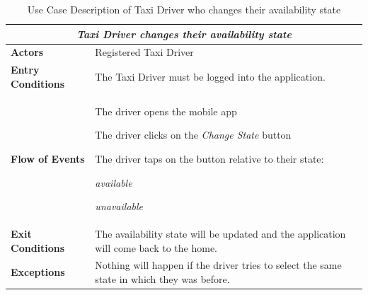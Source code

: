 \documentclass[a4paper]{article}
\begin{document}
\begin{table} [H]
\begin{center}
\begin{tabular}{ |m{}|m{}|  }
\hline
    \multicolumn{2}{|c|}{\textbf{\textit{Taxi Driver changes their availability state}}} \\
\hline \hline
    \textbf{Actors}
&   Registered Taxi Driver
\\ \hline
    \textbf{Entry Conditions}
&   The Taxi Driver must be logged into the application.
\\ \hline
    \textbf{Flow of Events}
& 
    \begin{enumerate*}
    \item The driver opens the mobile app
    \item The driver clicks on the \emph{Change State} button
    \item The driver taps on the button relative to their state:
        \begin{itemize*}
        \item \emph{available}
        \item \emph{unavailable}
        \end{itemize*}
    \end{enumerate*}
\\ \hline
    \textbf{Exit Conditions}
&  The availability state will be updated and the application will come back to the home.
\\ \hline
    \textbf{Exceptions}
&   Nothing will happen if the driver tries to select the same state in which they was before.
\\ \hline
\end{tabular}
\end{center}
\caption{Use Case Description of Taxi Driver who changes their availability state}
\label{table:taxichangestate}
\end{table}
\end{document}
